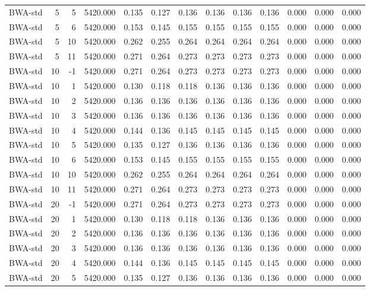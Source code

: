 \begin{table}
\begin{tabular}{lrrrrrrrrrrrr}
BWA-std & 5 & 5 & 5420.000 & 0.135 & 0.127 & 0.136 & 0.136 & 0.136 & 0.136 & 0.000 & 0.000 & 0.000 \\
BWA-std & 5 & 6 & 5420.000 & 0.153 & 0.145 & 0.155 & 0.155 & 0.155 & 0.155 & 0.000 & 0.000 & 0.000 \\
BWA-std & 5 & 10 & 5420.000 & 0.262 & 0.255 & 0.264 & 0.264 & 0.264 & 0.264 & 0.000 & 0.000 & 0.000 \\
BWA-std & 5 & 11 & 5420.000 & 0.271 & 0.264 & 0.273 & 0.273 & 0.273 & 0.273 & 0.000 & 0.000 & 0.000 \\
BWA-std & 10 & -1 & 5420.000 & 0.271 & 0.264 & 0.273 & 0.273 & 0.273 & 0.273 & 0.000 & 0.000 & 0.000 \\
BWA-std & 10 & 1 & 5420.000 & 0.130 & 0.118 & 0.118 & 0.136 & 0.136 & 0.136 & 0.000 & 0.000 & 0.000 \\
BWA-std & 10 & 2 & 5420.000 & 0.136 & 0.136 & 0.136 & 0.136 & 0.136 & 0.136 & 0.000 & 0.000 & 0.000 \\
BWA-std & 10 & 3 & 5420.000 & 0.136 & 0.136 & 0.136 & 0.136 & 0.136 & 0.136 & 0.000 & 0.000 & 0.000 \\
BWA-std & 10 & 4 & 5420.000 & 0.144 & 0.136 & 0.145 & 0.145 & 0.145 & 0.145 & 0.000 & 0.000 & 0.000 \\
BWA-std & 10 & 5 & 5420.000 & 0.135 & 0.127 & 0.136 & 0.136 & 0.136 & 0.136 & 0.000 & 0.000 & 0.000 \\
BWA-std & 10 & 6 & 5420.000 & 0.153 & 0.145 & 0.155 & 0.155 & 0.155 & 0.155 & 0.000 & 0.000 & 0.000 \\
BWA-std & 10 & 10 & 5420.000 & 0.262 & 0.255 & 0.264 & 0.264 & 0.264 & 0.264 & 0.000 & 0.000 & 0.000 \\
BWA-std & 10 & 11 & 5420.000 & 0.271 & 0.264 & 0.273 & 0.273 & 0.273 & 0.273 & 0.000 & 0.000 & 0.000 \\
BWA-std & 20 & -1 & 5420.000 & 0.271 & 0.264 & 0.273 & 0.273 & 0.273 & 0.273 & 0.000 & 0.000 & 0.000 \\
BWA-std & 20 & 1 & 5420.000 & 0.130 & 0.118 & 0.118 & 0.136 & 0.136 & 0.136 & 0.000 & 0.000 & 0.000 \\
BWA-std & 20 & 2 & 5420.000 & 0.136 & 0.136 & 0.136 & 0.136 & 0.136 & 0.136 & 0.000 & 0.000 & 0.000 \\
BWA-std & 20 & 3 & 5420.000 & 0.136 & 0.136 & 0.136 & 0.136 & 0.136 & 0.136 & 0.000 & 0.000 & 0.000 \\
BWA-std & 20 & 4 & 5420.000 & 0.144 & 0.136 & 0.145 & 0.145 & 0.145 & 0.145 & 0.000 & 0.000 & 0.000 \\
BWA-std & 20 & 5 & 5420.000 & 0.135 & 0.127 & 0.136 & 0.136 & 0.136 & 0.136 & 0.000 & 0.000 & 0.000 \\

\end{tabular}
\end{table}
